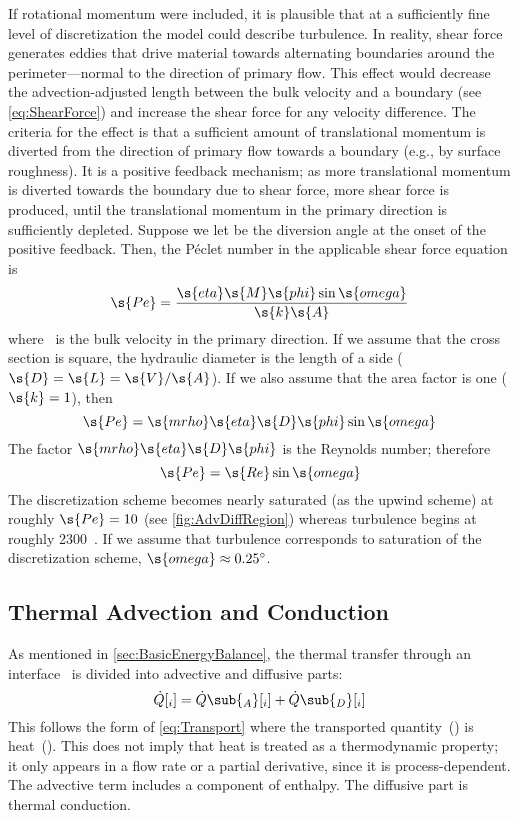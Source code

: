 If rotational momentum were included, it is plausible that at a sufficiently fine level of discretization the model could describe turbulence.  In reality, shear force generates eddies that drive material towards alternating boundaries around the perimeter---normal to the direction of primary flow.  This effect would decrease the advection-adjusted length between the bulk velocity and a boundary (see \autoref{eq:ShearForce}) and increase the shear force for any velocity difference.  The criteria for the effect is that a sufficient amount of translational momentum is diverted from the direction of primary flow towards a boundary (e.g., by surface roughness).  It is a positive feedback mechanism; as more translational momentum is diverted towards the boundary due to shear force, more shear force is produced, until the translational momentum in the primary direction is sufficiently depleted.  Suppose we let  be the diversion angle at the onset of the positive feedback.  Then, the P\'eclet number in the applicable shear force equation is
\begin{equation}
  \s{Pe} = \frac{\s{eta}\s{M}\s{phi}\sin\s{omega}}{\s{k}\s{A}}
\end{equation}
where ~is the bulk velocity in the primary direction.  If we assume that the cross section is square, the hydraulic diameter is the length of a side ($\s{D} = \s{L} = \s{V}/\s{A}$).  If we also assume that the area factor is one ($\s{k} = 1$), then
\begin{equation}
  \s{Pe} = \s{mrho}\s{eta}\s{D}\s{phi}\sin\s{omega}
\end{equation}
The factor $\s{mrho}\s{eta}\s{D}\s{phi}$ is the Reynolds number; therefore
\begin{equation}
  \s{Pe} = \s{Re}\sin\s{omega}
\end{equation}
The discretization scheme becomes nearly saturated (as the upwind scheme) at roughly $\s{Pe} = 10$ (see \autoref{fig:AdvDiffRegion}) whereas turbulence begins at roughly 2300~\cite{Cengel2006}.  If we assume that turbulence corresponds to saturation of the discretization scheme, $\s{omega} \approx 0.25^\circ$.


\subsection{Thermal Advection and Conduction}
\label{sec:ThermalTransport}


As mentioned in \autoref{sec:BasicEnergyBalance}, the thermal transfer through an interface ~is divided into advective and diffusive parts:
\begin{equation}
  \label{eq:ThermalTransport}
  \dot{Q}[_i] = \dot{Q}\sub{_A}[_i] + \dot{Q}\sub{_D}[_i]
\end{equation}
This follows the form of \autoref{eq:Transport} where the transported quantity~() is heat~().  This does not imply that heat is treated as a thermodynamic property; it only appears in a flow rate or a partial derivative, since it is process-dependent.  The advective term includes a component of enthalpy.  The diffusive part is thermal conduction.

